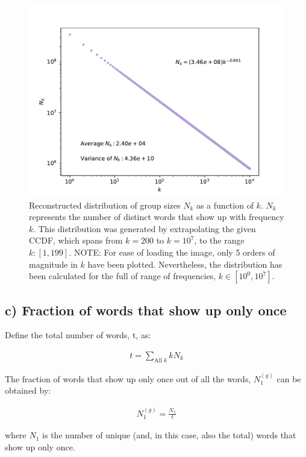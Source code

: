 \documentclass{article}
\begin{document}
\begin{figure}[h!]
\includegraphics[width=\linewidth]{Q04/wordFrequencyCCDFLog_extrapolated.pdf}
\caption{Reconstructed distribution of group sizes $N_k$ as a function of $k$. $N_k$ represents the number of distinct words that show up with frequency $k$. This distribution was generated by extrapolating the given CCDF, which spans from $k=200$ to $k=10^7$, to the range $k:[1,199]$. NOTE: For ease of loading the image, only 5 orders of magnitude in $k$ have been plotted. Nevertheless, the distribution has been calculated for the full of range of frequencies, $k \in [10^0,10^7]$.}
\end{figure}

\subsection{c) Fraction of words that show up only once}

Define the total number of words, t, as:

\begin{align}
t = \sum_{\text{All }k} k N_k
\end{align}

The fraction of words that show up only once out of all the words, $N_1^{(g)}$ can be obtained by:

\begin{align}
N_1^{(g)} = \frac{N_1}{t}
\end{align}

where $N_1$ is the number of unique (and, in this case, also the total) words that show up only once. \\
\end{document}
